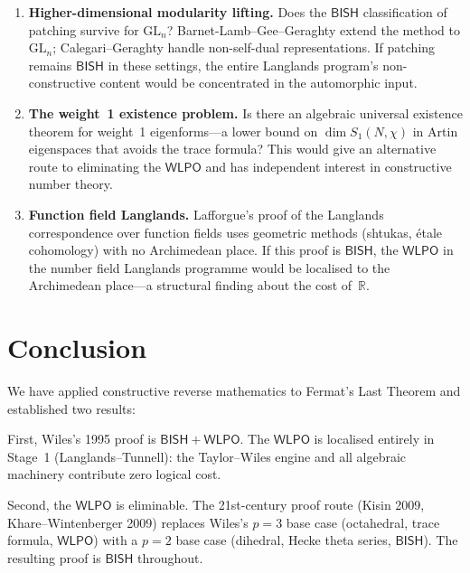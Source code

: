 \documentclass[11pt]{article}
\theoremstyle{plain}
\theoremstyle{definition}
\theoremstyle{remark}
\newcommand{\R}{\mathbb{R}}
\newcommand{\GL}{\mathrm{GL}}
\newcommand{\BISH}{\mathsf{BISH}}
\newcommand{\WLPO}{\mathsf{WLPO}}
\begin{document}
\begin{enumerate}[nosep]
\item \textbf{Higher-dimensional modularity lifting.}
  Does the $\BISH$ classification of patching survive for $\GL_n$?
  Barnet-Lamb--Gee--Geraghty \cite{BLGGT2014} extend the method to
  $\GL_n$; Calegari--Geraghty \cite{CalegariGeraghty2018} handle
  non-self-dual representations.  If patching remains $\BISH$ in
  these settings, the entire Langlands program's non-constructive
  content would be concentrated in the automorphic input.

\item \textbf{The weight~1 existence problem.}
  Is there an algebraic universal existence theorem for weight~1
  eigenforms---a lower bound on $\dim S_1(N, \chi)$ in Artin
  eigenspaces that avoids the trace formula?  This would give an
  alternative route to eliminating the $\WLPO$ and has independent
  interest in constructive number theory.

\item \textbf{Function field Langlands.}
  Lafforgue's proof of the Langlands correspondence over function
  fields uses geometric methods (shtukas, \'etale cohomology) with
  no Archimedean place.  If this proof is $\BISH$, the $\WLPO$ in
  the number field Langlands programme would be localised to the
  Archimedean place---a structural finding about the cost of~$\R$.
\end{enumerate}


\section{Conclusion}\label{sec:conclusion}

We have applied constructive reverse mathematics to Fermat's
Last Theorem and established two results:

First, Wiles's 1995 proof is $\BISH + \WLPO$.  The $\WLPO$
is localised entirely in Stage~1 (Langlands--Tunnell): the
Taylor--Wiles engine and all algebraic machinery contribute
zero logical cost.

Second, the $\WLPO$ is eliminable.  The 21st-century proof
route (Kisin 2009, Khare--Wintenberger 2009) replaces Wiles's
$p = 3$ base case (octahedral, trace formula, $\WLPO$) with a
$p = 2$ base case (dihedral, Hecke theta series, $\BISH$).
The resulting proof is $\BISH$ throughout.
\end{document}
